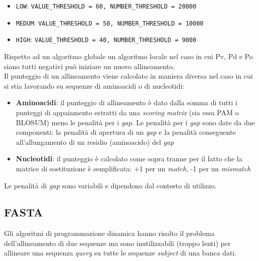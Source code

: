\documentclass[conference]{IEEEtran}
\begin{document}
\begin{itemize}
	\item \texttt{LOW}: \texttt{VALUE\_THRESHOLD = 60, NUMBER\_THRESHOLD = 20000}
	\item \texttt{MEDUM}: \texttt{VALUE\_THRESHOLD = 50, NUMBER\_THRESHOLD = 10000}
	\item \texttt{HIGH}: \texttt{VALUE\_THRESHOLD = 40, NUMBER\_THRESHOLD = 9000}
\end{itemize}

Rispetto ad un algoritmo globale un algoritmo locale nel caso in cui Pv, Pd e Po siano tutti negativi può iniziare un nuovo allineamento.\\
Il punteggio di un allineamento viene calcolato in maniera diversa nel caso in cui si stia lavorando su sequenze di aminoacidi o di nucleotidi:
\begin{itemize}
	\item \textbf{Aminoacidi}: il punteggio di allineamento è dato dalla somma di tutti i punteggi di appaiamento estratti da una \textit{scoring matrix} (sia essa PAM o BLOSUM) meno le penalità per i \textit{gap}. Le penalità per i \textit{gap} sono date da due componenti: la penalità di apertura di un \textit{gap} e la penalità conseguente all'allungamento di un residio (aminoacido) del \textit{gap}
	\item \textbf{Nucleotidi}: il punteggio è calcolato come sopra tranne per il fatto che la matrice di sostituzione è semplificata: +1 per un \textit{match}, -1 per un \textit{mismatch}
\end{itemize}
Le penalità di \textit{gap} sono variabili e dipendono dal contesto di utilizzo.

	\subsection{FASTA}

	Gli algoritmi di programmazione dinamica hanno risolto il problema dell'allineamento di due sequenze ma sono inutilizzabili (troppo lenti) per allineare una sequenza \textit{query} su tutte le sequenze \textit{subject} di una banca dati.\\
\end{document}
